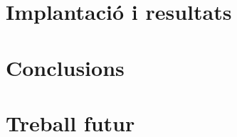 \documentclass[a4paper,12pt]{ThesisStyle}
\begin{document}
\chapter{Implantació i resultats}
\label{cap:implantacio}



\chapter{Conclusions}
\label{cap:conclusions}



\chapter{Treball futur}
\label{cap:treball_futur}




\backmatter


%




\end{document}
